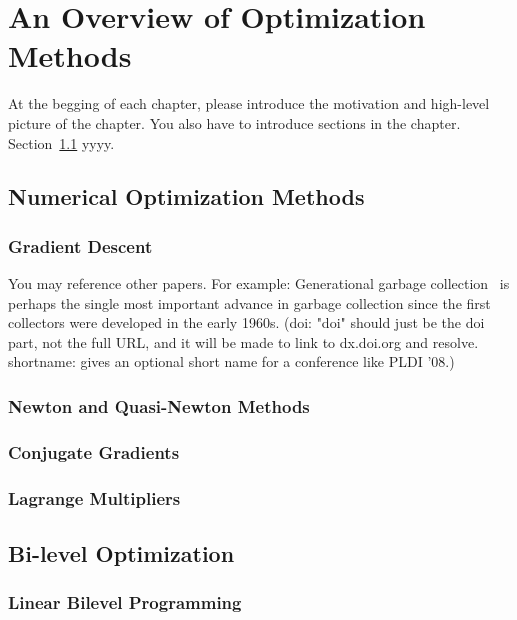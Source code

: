 \chapter{An Overview of Optimization Methods}
\label{cha:overviewpart1}
At the begging of each chapter, please introduce the motivation and high-level
picture of the chapter. You also have to introduce sections in the
chapter. \\


Section~\ref{sec:relatedwork} yyyy.\\




\section{Numerical Optimization Methods}
\label{sec:relatedwork}

\subsection{Gradient Descent}
You may reference other papers. For example:
Generational garbage collection~\citep{LH:83,Moon:84,Ungar:84} is perhaps the
single most important advance in garbage collection since the first collectors
were developed in the early 1960s. (doi: "doi" should just be the doi part, not
the full URL, and it will be made to link to dx.doi.org and resolve.
shortname: gives an optional short name for a conference like PLDI '08.)
\subsection{Newton and Quasi-Newton Methods}

\subsection{Conjugate Gradients}

\subsection{Lagrange Multipliers}

\section{Bi-level Optimization}
\subsection{Linear Bilevel Programming}
